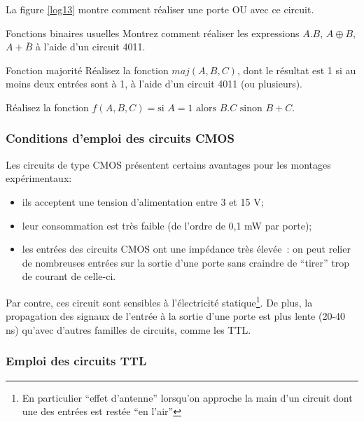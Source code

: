 La figure \ref{log13} montre comment r\'ealiser une porte OU avec ce circuit.

\begin{exercice}{Fonctions binaires usuelles}
Montrez comment r\'ealiser les expressions $A.B$, $A \oplus B$, $A+\overline{B}$
à l'aide d'un circuit 4011.
\end{exercice}

\begin{exercice}{Fonction majorit\'e}
R\'ealisez la fonction $maj(A,B,C)$, dont le r\'esultat est 1 si au moins deux
entr\'ees sont à 1, à l'aide d'un circuit 4011 (ou plusieurs).
\end{exercice}

\begin{exercice}{}
R\'ealisez la fonction $f(A,B,C)= \mbox{si $A=1$ alors $B.C$ sinon $B+C$}$.
\end{exercice}

\subsubsection{Conditions d'emploi des circuits CMOS}

Les circuits de type CMOS pr\'esentent certains avantages pour les
montages exp\'erimentaux:

\begin{itemize}
\item ils acceptent une tension d'alimentation entre 3 et 15 V;
\item leur consommation est tr\`es faible (de l'ordre de 0,1 mW par porte);
\item les entr\'ees des circuits CMOS ont une imp\'edance tr\`es \'elev\'ee~: on peut
relier de nombreuses entr\'ees sur la sortie d'une porte sans craindre 
de ``tirer''
trop de courant de celle-ci.
\end{itemize}

Par contre, ces circuit sont sensibles \`a l'\'electricit\'e
statique\footnote{En particulier ``effet d'antenne'' lorsqu'on
approche la main d'un circuit dont une des entrées est restée ``en
l'air''}.  De plus, la propagation des signaux de l'entr\'ee \`a la
sortie d'une porte est plus lente (20-40 ns) qu'avec d'autres familles
de circuits, comme les TTL.

\subsubsection{Emploi des circuits TTL}

